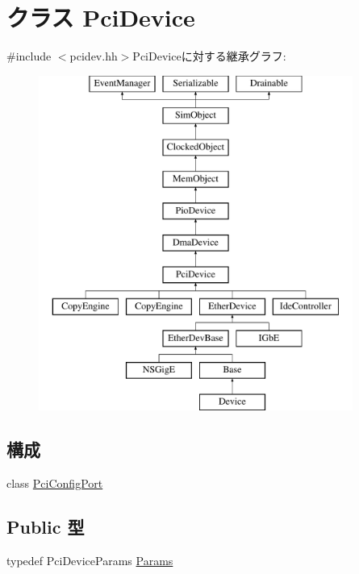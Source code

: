 \hypertarget{classPciDevice}{
\section{クラス PciDevice}
\label{classPciDevice}
}


{\ttfamily \#include $<$pcidev.hh$>$}PciDeviceに対する継承グラフ:\begin{figure}[H]
\begin{center}
\leavevmode
\includegraphics[height=11cm]{classPciDevice}
\end{center}
\end{figure}
\subsection*{構成}
\begin{DoxyCompactItemize}
\item 
class \hyperlink{classPciDevice_1_1PciConfigPort}{PciConfigPort}
\end{DoxyCompactItemize}
\subsection*{Public 型}
\begin{DoxyCompactItemize}
\item 
typedef PciDeviceParams \hyperlink{classPciDevice_aefbfd3f2d9daf3173b779eeff32e8112}{Params}
\end{DoxyCompactItemize}
